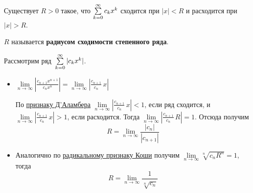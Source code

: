 \begin{consequent}
Существует $R > 0$ такое, что $\series[0] c_k x^k$ сходится при $|x| < R$ и расходится при $|x| > R$.
\end{consequent}

$R$ называется \textbf{радиусом сходимости степенного ряда}.

Рассмотрим ряд~$\series[0] |c_k x^k|$.
\begin{itemize}
	\item $\lim\limits_{n \to \infty} \left| \frac{c_{n+1} x^{n+1}}{c_n x^n} \right| =
	\lim\limits_{n \to \infty} \left| \frac{c_{n+1}}{c_n}\,x \right|$
	
	По \hyperref[th:d'Alembert's_ratio_test]{признаку Д'Аламбера} $\lim\limits_{n \to \infty} \left| \frac{c_{n+1}}{c_n}\,x \right| < 1$, если ряд сходится, и $\lim\limits_{n \to \infty} \left| \frac{c_{n+1}}{c_n}\,x \right| > 1$, если расходится.
	Тогда $\lim\limits_{n \to \infty} \left| \frac{c_{n+1}}{c_n}\,R \right| = 1$.
	Отсюда получим
	\begin{equation*}
	R = \lim_{n \to \infty} \frac{|c_n|}{|c_{n+1}|}
	\end{equation*}
	
	\item Аналогично по \hyperref[th:Cauchy's_radical_test]{радикальному признаку Коши} получим $\lim\limits_{n \to \infty} \sqrt[n]{c_n R^n} = 1$, тогда
	\begin{equation*}
	R = \lim_{n \to \infty} \frac1{\sqrt[n]{c_n}}
	\end{equation*}
\end{itemize}
